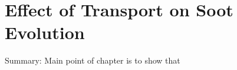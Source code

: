 \chapter{Effect of Transport on Soot Evolution\label{ch:transport}}

Summary: Main point of chapter is to show that 




